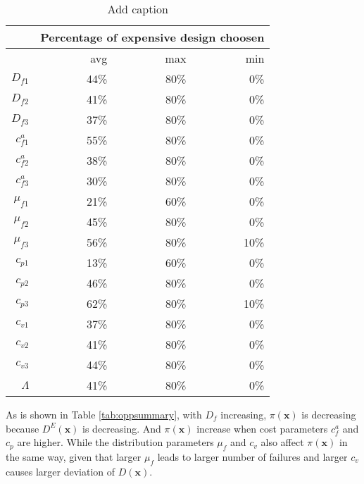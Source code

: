 \documentclass[preprint,12pt]{elsarticle}
\begin{document}
\begin{table}[htbp]
  \centering
  \caption{Add caption}
    \begin{tabular}{rrrr}
    \toprule
          & \multicolumn{3}{c}{Percentage of expensive design choosen} \\
    \midrule
          & avg   & max   & min \\
    $D_{f1}$ & 44\%  & 80\%  & 0\% \\
    $D_{f2}$ & 41\%  & 80\%  & 0\% \\
    $D_{f3}$ & 37\%  & 80\%  & 0\% \\
    $c^{a}_{f1}$ & 55\%  & 80\%  & 0\% \\
    $c^{a}_{f2}$ & 38\%  & 80\%  & 0\% \\
    $c^{a}_{f3}$ & 30\%  & 80\%  & 0\% \\
    $\mu_{f1}$ & 21\%  & 60\%  & 0\% \\
    $\mu_{f2}$ & 45\%  & 80\%  & 0\% \\
    $\mu_{f3}$ & 56\%  & 80\%  & 10\% \\
    $c_{p1}$ & 13\%  & 60\%  & 0\% \\
    $c_{p2}$ & 46\%  & 80\%  & 0\% \\
    $c_{p3}$ & 62\%  & 80\%  & 10\% \\
    $c_{v1}$ & 37\%  & 80\%  & 0\% \\
    $c_{v2}$ & 41\%  & 80\%  & 0\% \\
    $c_{v3}$ & 44\%  & 80\%  & 0\% \\
    $\Lambda$ & 41\%  & 80\%  & 0\% \\
    \bottomrule
    \end{tabular}%
  \label{tab:addlabel}%
\end{table}%


As is shown in Table \ref{tab:oppsummary}, with $D_{f}$ increasing, $\pi(\boldsymbol{x})$ is decreasing because $D^{E}(\boldsymbol{x})$ is decreasing. And $\pi(\boldsymbol{x})$ increase when cost parameters $c^{a}_{f}$ and $c_{p}$ are higher. While the distribution parameters $\mu_{f}$ and $c_{v}$ also affect $\pi(\boldsymbol{x})$ in the same way, given that larger $\mu_{f}$ leads to larger number of failures and larger $c_{v}$ causes larger deviation of $D(\boldsymbol{x})$.
\end{document}
